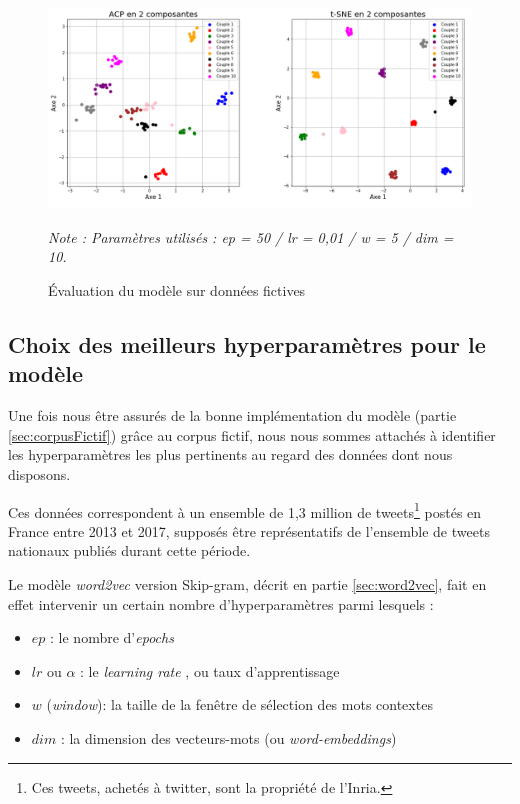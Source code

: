 \documentclass[11pt,french,french]{article}
\let\rmarkdownfootnote\footnote%
\def\footnote{\protect\rmarkdownfootnote}
\begin{document}
\begin{figure}
\begin{center}
\includegraphics[width=1\textwidth]{img/figures.png}
\captionsetup{margin=0cm,format=hang,justification=justified}
\caption{Évaluation du modèle sur données fictives}\label{fig:figure_evaluation}
\end{center}
\vspace{-0.3cm}
\footnotesize
\emph{Note : Paramètres utilisés : ep = 50 / lr = 0,01 / w = 5 / dim = 10.}
\end{figure}

\hypertarget{sec:hyperparametres}{%
\subsection{Choix des meilleurs hyperparamètres pour le modèle}\label{sec:hyperparametres}}

Une fois nous être assurés de la bonne implémentation du modèle (partie \ref{sec:corpusFictif}) grâce au corpus fictif, nous nous sommes attachés à identifier les hyperparamètres les plus pertinents au regard des données dont nous disposons.

Ces données correspondent à un ensemble de 1,3 million de tweets\footnote{Ces tweets, achetés à twitter, sont la propriété de l'Inria.}
postés en France entre 2013 et 2017, supposés être représentatifs de l'ensemble de tweets nationaux publiés durant cette période.

Le modèle \emph{word2vec} version Skip-gram, décrit en partie \ref{sec:word2vec}, fait en effet intervenir un certain nombre d'hyperparamètres parmi lesquels :

\begin{itemize}
\item $ep$ : le nombre d'\og \emph{epochs} \fg{}
\item $lr$ ou $\alpha$ : le \og \emph{learning rate} \fg{}, ou taux d'apprentissage
\item $w$ (\emph{window}): la taille de la fenêtre de sélection des mots contextes
\item $dim$ : la dimension des vecteurs-mots (ou \emph{word-embeddings})
\end{itemize}
\end{document}
